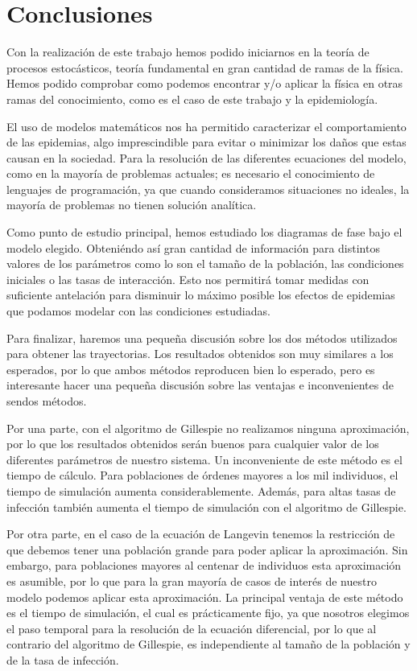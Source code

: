 \chapter{Conclusiones}

Con la realización de este trabajo hemos podido iniciarnos en la teoría de procesos estocásticos, teoría fundamental en gran cantidad de ramas
de la física. Hemos podido comprobar como podemos encontrar y/o aplicar la física en otras ramas del conocimiento, como es el caso de este trabajo
y la epidemiología. 

El uso de modelos matemáticos nos ha permitido caracterizar el comportamiento de las epidemias, algo imprescindible para evitar 
o minimizar los daños que estas causan en la sociedad. Para la resolución de las diferentes ecuaciones del modelo, como en la 
mayoría de problemas actuales; es necesario el conocimiento de lenguajes de programación, ya que cuando consideramos situaciones no 
ideales, la mayoría de problemas no tienen solución analítica. 

Como punto de estudio principal, hemos estudiado los diagramas de fase bajo el modelo elegido. Obteniéndo así gran cantidad de información
para distintos valores de los parámetros como lo son el tamaño de la población, las condiciones iniciales o las tasas de interacción. Esto
nos permitirá tomar medidas con suficiente antelación para disminuir lo máximo posible los efectos de epidemias que 
podamos modelar con las condiciones estudiadas.

Para finalizar, haremos una pequeña discusión sobre los dos métodos utilizados para obtener las trayectorias. Los resultados obtenidos son muy similares a los esperados, por lo que ambos métodos
reproducen bien lo esperado, pero es interesante hacer una pequeña discusión sobre las ventajas e inconvenientes de sendos métodos.

Por una parte, con el algoritmo de Gillespie no realizamos ninguna aproximación, por lo que los resultados obtenidos serán 
buenos para cualquier valor de los diferentes parámetros de nuestro sistema. Un inconveniente de este método es el tiempo de cálculo.
Para poblaciones de órdenes mayores a los mil individuos, el tiempo de simulación aumenta considerablemente. Además, para altas 
tasas de infección también aumenta el tiempo de simulación con el algoritmo de Gillespie.

Por otra parte, en el caso de la ecuación de Langevin tenemos la restricción de que debemos tener una población grande para poder aplicar
la aproximación. Sin embargo, para poblaciones mayores al centenar de individuos esta aproximación es asumible, por lo que para la gran mayoría 
de casos de interés de nuestro modelo podemos aplicar esta aproximación. La principal ventaja de este método es el tiempo de simulación,
el cual es prácticamente fijo, ya que nosotros elegimos el paso temporal para la resolución de la ecuación diferencial, por lo que al contrario
del algoritmo de Gillespie, es independiente al tamaño de la población y de la tasa de infección.

